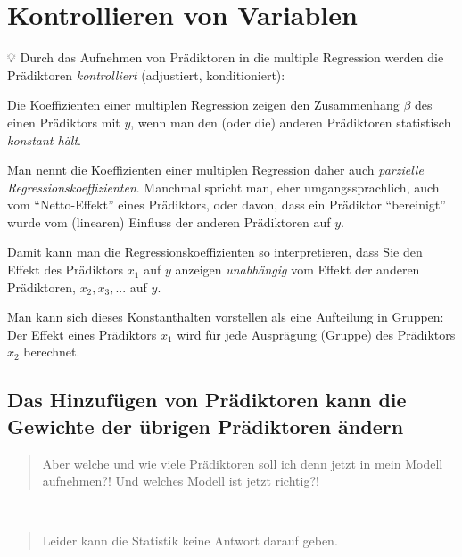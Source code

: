 \documentclass[
  a4paper,
  DIV=11]{scrreprt}
\theoremstyle{definition}
\theoremstyle{remark}
\begin{document}
\hypertarget{kontrollieren-von-variablen}{%
\section{Kontrollieren von
Variablen}\label{kontrollieren-von-variablen}}

💡 Durch das Aufnehmen von Prädiktoren in die multiple Regression werden
die Prädiktoren \emph{kontrolliert} (adjustiert, konditioniert):

Die Koeffizienten einer multiplen Regression zeigen den Zusammenhang
\(\beta\) des einen Prädiktors mit \(y\), wenn man den (oder die)
anderen Prädiktoren statistisch \emph{konstant hält}.

Man nennt die Koeffizienten einer multiplen Regression daher auch
\emph{parzielle Regressionskoeffizienten}. Manchmal spricht man, eher
umgangssprachlich, auch vom ``Netto-Effekt'' eines Prädiktors, oder
davon, dass ein Prädiktor ``bereinigt'' wurde vom (linearen) Einfluss
der anderen Prädiktoren auf \(y\).

Damit kann man die Regressionskoeffizienten so interpretieren, dass Sie
den Effekt des Prädiktors \(x_1\) auf \(y\) anzeigen \emph{unabhängig}
vom Effekt der anderen Prädiktoren, \(x_2,x_3,...\) auf \(y\).

Man kann sich dieses Konstanthalten vorstellen als eine Aufteilung in
Gruppen: Der Effekt eines Prädiktors \(x_1\) wird für jede Ausprägung
(Gruppe) des Prädiktors \(x_2\) berechnet.

\hypertarget{das-hinzufuxfcgen-von-pruxe4diktoren-kann-die-gewichte-der-uxfcbrigen-pruxe4diktoren-uxe4ndern}{%
\subsection{Das Hinzufügen von Prädiktoren kann die Gewichte der übrigen
Prädiktoren
ändern}\label{das-hinzufuxfcgen-von-pruxe4diktoren-kann-die-gewichte-der-uxfcbrigen-pruxe4diktoren-uxe4ndern}}

\begin{quote}
Aber welche und wie viele Prädiktoren soll ich denn jetzt in mein Modell
aufnehmen?! Und welches Modell ist jetzt richtig?!
\end{quote}

🧑

\begin{quote}
Leider kann die Statistik keine Antwort darauf geben.
\end{quote}

👩
\end{document}
